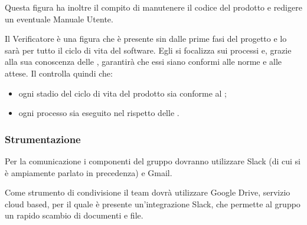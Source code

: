                 Questa figura ha inoltre il compito di manutenere il codice del prodotto e redigere un eventuale Manuale Utente.


                Il Verificatore è una figura che è presente sin dalle prime fasi del progetto e lo sarà per tutto il ciclo di vita del software.
                Egli si focalizza sui processi e, grazie alla sua conoscenza delle \NormeProgetto{}, garantirà che essi
                siano conformi alle norme e alle attese.
                Il \Verificatore{} controlla quindi che:

                    \begin{itemize}
                        \item ogni stadio del ciclo di vita del prodotto sia conforme al \vPianoDiQualifica{};
                        \item ogni processo sia eseguito nel rispetto delle \vNormeDiProgetto{}.
                    \end{itemize}

        \subsubsection{Strumentazione}


            Per la comunicazione i componenti del gruppo dovranno utilizzare Slack (di cui si è ampiamente parlato in
            precedenza) e Gmail.


            Come strumento di condivisione il team dovrà utilizzare Google Drive, servizio cloud based,
            per il quale è presente un'integrazione Slack, che permette al gruppo un rapido scambio di documenti e file.

